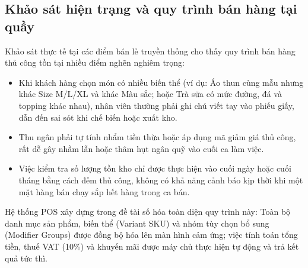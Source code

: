 \subsection{Khảo sát hiện trạng và quy trình bán hàng tại quầy}
Khảo sát thực tế tại các điểm bán lẻ truyền thống cho thấy quy trình bán hàng thủ công tồn tại nhiều điểm nghẽn nghiêm trọng:
\begin{itemize}[leftmargin=1.5cm]
    \item Khi khách hàng chọn món có nhiều biến thể (ví dụ: Áo thun cùng mẫu nhưng khác Size M/L/XL và khác Màu sắc; hoặc Trà sữa có mức đường, đá và topping khác nhau), nhân viên thường phải ghi chú viết tay vào phiếu giấy, dẫn đến sai sót khi chế biến hoặc xuất kho.
    \item Thu ngân phải tự tính nhẩm tiền thừa hoặc áp dụng mã giảm giá thủ công, rất dễ gây nhầm lẫn hoặc thâm hụt ngân quỹ vào cuối ca làm việc.
    \item Việc kiểm tra số lượng tồn kho chỉ được thực hiện vào cuối ngày hoặc cuối tháng bằng cách đếm thủ công, không có khả năng cảnh báo kịp thời khi một mặt hàng bán chạy sắp hết hàng trong ca bán.
\end{itemize}

Hệ thống POS xây dựng trong đề tài số hóa toàn diện quy trình này: Toàn bộ danh mục sản phẩm, biến thể (Variant SKU) và nhóm tùy chọn bổ sung (Modifier Groups) được đồng bộ hóa lên màn hình cảm ứng; việc tính toán tổng tiền, thuế VAT (10\%) và khuyến mãi được máy chủ thực hiện tự động và trả kết quả tức thì.


